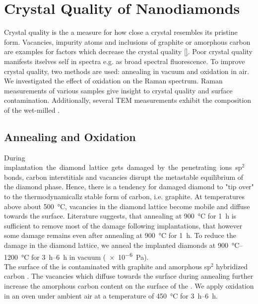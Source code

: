 
\chapter{Crystal Quality of Nanodiamonds}	\label{ch::crystal_quality}

Crystal quality is the a measure for how close a crystal resembles its pristine form\cite{}.
Vacancies, impurity atoms and inclusions of graphite or amorphous carbon are examples for factors which decrease the crystal quality \autoref{}.
Poor crystal quality manifests itselves self in \pl spectra e.g. as broad spectral \bkg fluorescence.
To improve crystal quality, two methods are used: annealing in vacuum and oxidation in air.
We investigated the effect of oxidation on the Raman spectrum.
Raman measurements of various samples give insight to crystal quality and surface contamination.
Additionally, several TEM measurements exhibit the composition of the wet-milled \nds. 

	\section{Annealing and Oxidation}\label{sec::ann_ox}

	During \si implantation the diamond lattice gets damaged by the penetrating ions.
	sp$^2$ bonds, carbon interstitials and vacancies disrupt the metastable equilibrium of the diamond phase. Hence, there is a tendency for damaged diamond to "tip over" to the thermodynamicallz stable form of carbon, i.e. graphite.
	At temperatures above about \SI{500}{\celsius}, vacancies in the diamond lattice become mobile and diffuse towards the surface\cite{Dresselhaus1992}.
	Literature suggests, that annealing at \SI{900}{\celsius} for \SI{1}{\hour} is sufficient to remove most of the damage following implantations, that however some damage remains even after annealing at \SI{900}{\celsius} for \SI{1}{\hour}.
	To reduce the damage in the diamond lattice, we anneal the implanted diamonds at \SIrange{900}{1200}{\celsius} for \SIrange{3}{6}{h} in vacuum (\SI{e-6}{Pa}).
	\\
	The surface of the \nds is contaminated with graphite and amorphous sp$^2$ hybridized carbon .
	The vacancies which diffuse towards the surface during annealing further increase the amorphous carbon content on the surface of the \nds \cite{}.
	We apply oxidation in an oven under ambient air at a temperature of \SI{450}{\celsius} for \SIrange{3}{6}{h}.


